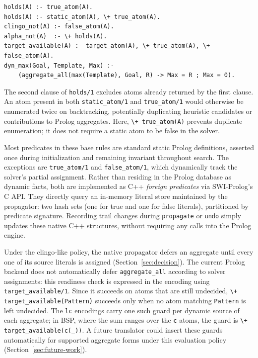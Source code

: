 \begin{verbatim}
holds(A) :- true_atom(A).
holds(A) :- static_atom(A), \+ true_atom(A).
clingo_not(A) :- false_atom(A).
alpha_not(A)  :- \+ holds(A).
target_available(A) :- target_atom(A), \+ true_atom(A), \+ false_atom(A).
dyn_max(Goal, Template, Max) :-
    (aggregate_all(max(Template), Goal, R) -> Max = R ; Max = 0).
\end{verbatim}

The second clause of \texttt{holds/1} excludes atoms already returned by the first clause. An atom present in both \texttt{static\_atom/1} and \texttt{true\_atom/1} would otherwise be enumerated twice on backtracking, potentially duplicating heuristic candidates or contributions to Prolog aggregates. Here, \texttt{\textbackslash+ true\_atom(A)} prevents duplicate enumeration; it does not require a static atom to be false in the solver.

Most predicates in these base rules are standard static Prolog definitions, asserted once during initialization and remaining invariant throughout search. The exceptions are \texttt{true\_atom/1} and \texttt{false\_atom/1}, which dynamically track the solver's partial assignment. Rather than residing in the Prolog database as dynamic facts, both are implemented as C++ \emph{foreign predicates} via SWI-Prolog's C API. They directly query an in-memory literal store maintained by the propagator: two hash sets (one for true and one for false literals), partitioned by predicate signature. Recording trail changes during \texttt{propagate} or \texttt{undo} simply updates these native C++ structures, without requiring any calls into the Prolog engine.


Under the clingo-like policy, the native propagator defers an aggregate until every one of its source literals is assigned (Section~\ref{sec:decision}). The current Prolog backend does not automatically defer \texttt{aggregate\_all} according to solver assignments: this readiness check is expressed in the encoding using \texttt{target\_available/1}. Since it succeeds on atoms that are still undecided, \texttt{\textbackslash+ target\_available(Pattern)} succeeds only when no atom matching \texttt{Pattern} is left undecided. The \texttt{lc} encodings carry one such guard per dynamic source of each aggregate; in BSP, where the sum ranges over the \texttt{c} atoms, the guard is \texttt{\textbackslash+ target\_available(c(\_))}. A future translator could insert these guards automatically for supported aggregate forms under this evaluation policy (Section~\ref{sec:future-work}).

